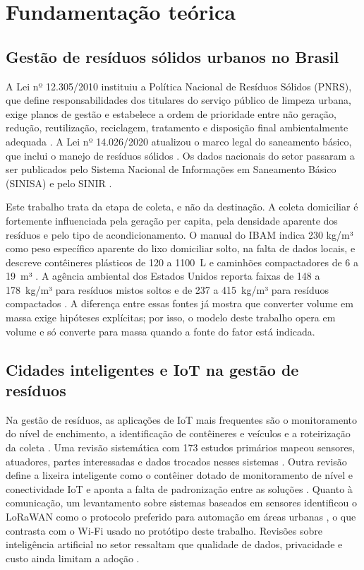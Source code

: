 \section{Fundamentação teórica}\label{sec:fundamentacao}

\subsection{Gestão de resíduos sólidos urbanos no Brasil}

A Lei nº 12.305/2010 instituiu a Política Nacional de Resíduos Sólidos (PNRS),
que define responsabilidades dos titulares do serviço público de limpeza
urbana, exige planos de gestão e estabelece a ordem de prioridade entre não
geração, redução, reutilização, reciclagem, tratamento e disposição final
ambientalmente adequada \cite{brasil2010lei}. A Lei nº 14.026/2020 atualizou o
marco legal do saneamento básico, que inclui o manejo de resíduos sólidos
\cite{brasil2020lei}. Os dados nacionais do setor passaram a ser publicados
pelo Sistema Nacional de Informações em Saneamento Básico (SINISA) e pelo
SINIR \cite{brasil2025sinisa,sinirsdportal}.

Este trabalho trata da etapa de coleta, e não da destinação. A coleta
domiciliar é fortemente influenciada pela geração per capita, pela densidade
aparente dos resíduos e pelo tipo de acondicionamento. O manual do IBAM indica
\num{230} kg/m³ como peso específico aparente do lixo domiciliar solto, na
falta de dados locais, e descreve contêineres plásticos de 120 a \num{1100}~L
e caminhões compactadores de 6 a 19~m³ \cite{monteiro2001manual}. A agência
ambiental dos Estados Unidos reporta faixas de 148 a 178~kg/m³ para resíduos
mistos soltos e de 237 a 415~kg/m³ para resíduos compactados
\cite{epa2016volume}. A diferença entre essas fontes já mostra que converter
volume em massa exige hipóteses explícitas; por isso, o modelo deste trabalho
opera em volume e só converte para massa quando a fonte do fator está indicada.

\subsection{Cidades inteligentes e IoT na gestão de resíduos}

Na gestão de resíduos, as aplicações de IoT mais frequentes são o
monitoramento do nível de enchimento, a identificação de contêineres e veículos
e a roteirização da coleta \cite{anagnostopoulos2017challenges,esmaeilian2018future}.
Uma revisão sistemática com 173 estudos primários mapeou sensores, atuadores,
partes interessadas e dados trocados nesses sistemas \cite{sosunova2022iot}.
Outra revisão define a lixeira inteligente como o contêiner dotado de
monitoramento de nível e conectividade IoT e aponta a falta de padronização
entre as soluções \cite{zoumpoulis2024smart}. Quanto à comunicação, um
levantamento sobre sistemas baseados em sensores identificou o LoRaWAN como o
protocolo preferido para automação em áreas urbanas \cite{vishnu2022sensor},
o que contrasta com o Wi-Fi usado no protótipo deste trabalho. Revisões sobre
inteligência artificial no setor ressaltam que qualidade de dados, privacidade e
custo ainda limitam a adoção \cite{olawade2024smart}.

